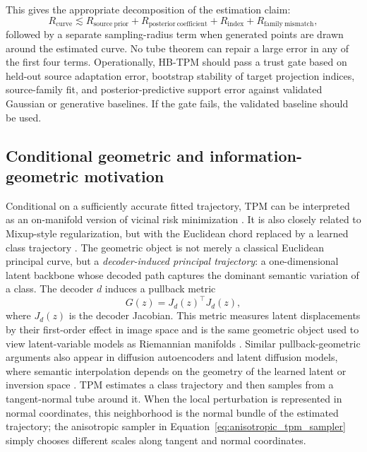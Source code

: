 \documentclass[preprint,12pt,number]{elsarticle}
\begin{document}
This gives the appropriate decomposition of the estimation claim:
\begin{equation}
	R_{\mathrm{curve}}
	\lesssim
	R_{\mathrm{source\ prior}}
	+R_{\mathrm{posterior\ coefficient}}
	+R_{\mathrm{index}}
	+R_{\mathrm{family\ mismatch}},
	\label{eq:hb_risk_decomposition}
\end{equation}
followed by a separate sampling-radius term when generated points are drawn around the estimated curve. No tube theorem can repair a large error in any of the first four terms. Operationally, HB-TPM should pass a trust gate based on held-out source adaptation error, bootstrap stability of target projection indices, source-family fit, and posterior-predictive support error against validated Gaussian or generative baselines. If the gate fails, the validated baseline should be used.

\subsection{Conditional geometric and information-geometric motivation}
Conditional on a sufficiently accurate fitted trajectory, TPM can be interpreted as an on-manifold version of vicinal risk minimization \citep{chapelle2000vicinal, vapnik1998statistical}. It is also closely related to Mixup-style regularization, but with the Euclidean chord replaced by a learned class trajectory \citep{zhang2018mixup, verma2019manifoldmixup}. The geometric object is not merely a classical Euclidean principal curve, but a \emph{decoder-induced principal trajectory}: a one-dimensional latent backbone whose decoded path captures the dominant semantic variation of a class. The decoder $d$ induces a pullback metric
\[
	G(z)=J_d(z)^\top J_d(z),
\]
where $J_d(z)$ is the decoder Jacobian. This metric measures latent displacements by their first-order effect in image space and is the same geometric object used to view latent-variable models as Riemannian manifolds \citep{amari1998natural, hauberg2015principal, arvanitidis2018latent, shao2018riemannian}. Similar pullback-geometric arguments also appear in diffusion autoencoders and latent diffusion models, where semantic interpolation depends on the geometry of the learned latent or inversion space \citep{preechakul2022diffusion, rombach2022high}. TPM estimates a class trajectory and then samples from a tangent-normal tube around it. When the local perturbation is represented in normal coordinates, this neighborhood is the normal bundle of the estimated trajectory; the anisotropic sampler in Equation~\ref{eq:anisotropic_tpm_sampler} simply chooses different scales along tangent and normal coordinates.
\end{document}
